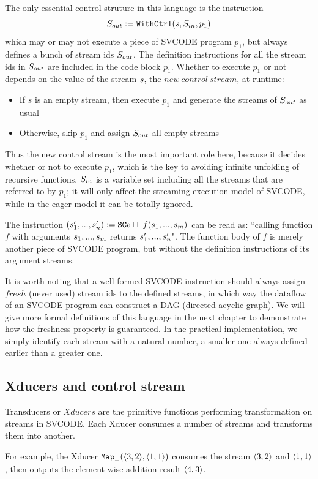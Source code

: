 The only essential control struture in this language is the \wc instruction 
$$\withctrl{\s}{p_1}{\Sin}{\Sout} $$
which may or may not execute a piece of SVCODE program $p_1$, but always defines a bunch of stream ids $\Sout$.
The definition instructions for all the stream ids in $\Sout$ are included in the code block $p_1$. 
Whether to execute $p_1$ or not depends on the value of the stream $\s$, the $new \ control \ stream$, at runtime:
\begin{itemize}
	\item If $s$ is an empty stream, then execute $p_1$ and generate the streams of $\Sout$ as usual
	\item Otherwise, skip $p_1$ and assign $\Sout$ all empty streams 
\end{itemize}
Thus the new control stream is the most important role here, because it decides whether or not to execute $p_1$, which is the key to avoiding infinite unfolding of recursive functions.  
$\Sin$ is a variable set including all the streams that are referred to by $p_1$;
it will only affect the streaming execution model of SVCODE, while in the eager model it can be totally ignored.

The instruction $\scall{f}{\replc{m}{s}}{(\replc{n}{s'})}$ can be read as: ``calling function $f$ with arguments $\replc{m}{s}$ returns $\replc{n}{s'}$". 
The function body of $f$ is merely another piece of SVCODE program, but without the definition instructions of its argument streams.


It is worth noting that a well-formed SVCODE instruction should always assign $fresh$ (never used) stream ids to the defined streams, in which way the dataflow of an SVCODE program can construct a DAG (directed acyclic graph). 
We will give more formal definitions of this language in the next chapter
to demonstrate how the freshness property is guaranteed. 
In the practical implementation, we simply identify each stream with a natural number, a smaller one always defined earlier than a greater one. 


\subsection{Xducers and control stream}

Transducers or $Xducers$ are the primitive functions performing transformation on streams in SVCODE. 
Each Xducer consumes a number of streams and transforms them into another. 

For example, the Xducer $\map{+}(\<3,2\'>, \< 1,1\'>)$ consumes the stream $\<3,2\'>$ and $\< 1,1\'>$, then outputs 
the element-wise addition result $\<4, 3\'>$. 

